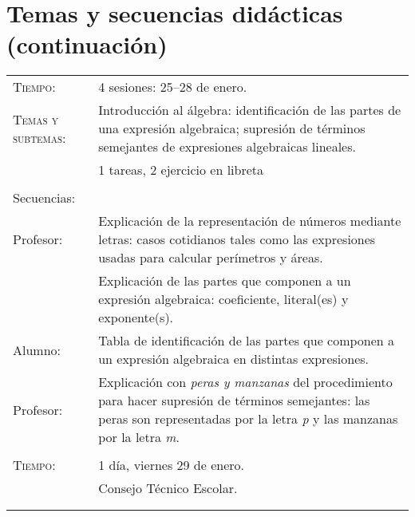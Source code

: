 \documentclass[letterpaper,10pt]{article}
\begin{document}
\newpage
\section{Temas  y secuencias did\'acticas (continuaci\'on)}

\begin{tabular}[t]{R{0.25\textwidth}p{0.71\textwidth}}
    \textsc{Tiempo:}                    & 4 sesiones: 25--28  de enero. \\
    \textsc{Temas y subtemas:}          & Introducci\'on al \'algebra: identificaci\'on de las partes de una expresi\'on algebraica; supresi\'on de t\'erminos semejantes de expresiones algebraicas lineales.\\
              & 1 tareas, 2 ejercicio en libreta\\ \\
    \large{\sc Secuencias:} \\
    Profesor:   & Explicaci\'on de la representaci\'on de n\'umeros mediante letras: casos cotidianos tales como las expresiones usadas para calcular per\'imetros y \'areas. \\
    & Explicaci\'on de las partes que componen a un expresi\'on algebraica: coeficiente, literal(es) y exponente(s). \\
    Alumno:     & Tabla de identificaci\'on de las partes que componen a un expresi\'on algebraica en distintas expresiones. \\
    Profesor:   & Explicaci\'on con \emph{peras y manzanas} del procedimiento para hacer supresi\'on de t\'erminos semejantes: las peras son representadas por la letra \emph{p} y las manzanas por la letra \emph{m}.
    
\\ \hline \\
    \textsc{Tiempo:}& 1 d\'ia, viernes 29 de enero. \\
                    & {\Large \sc Consejo T\'ecnico Escolar.} \\ 
\\ \hline \\

\end{tabular}
\end{document}
